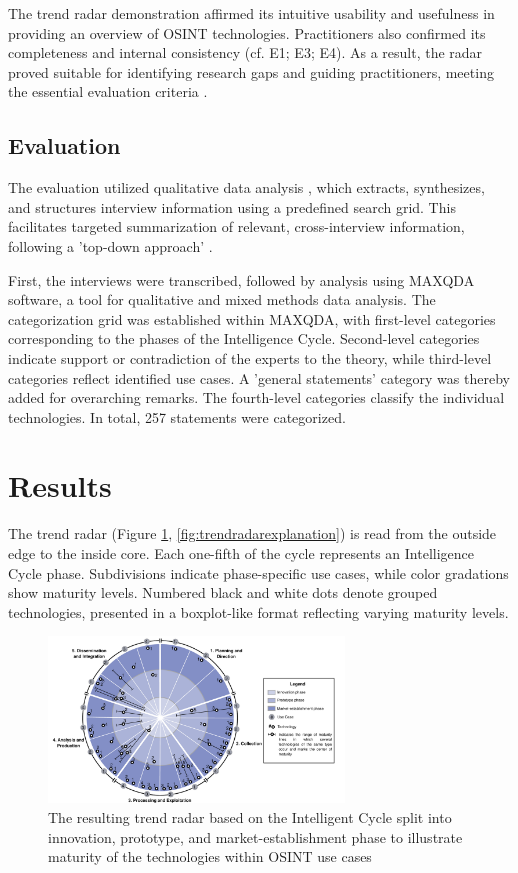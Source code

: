 \documentclass[10pt]{article}
\begin{document}
The trend radar demonstration affirmed its intuitive usability and usefulness in providing an overview of OSINT technologies. Practitioners also confirmed its completeness and internal consistency (cf. E1; E3; E4). As a result, the radar proved suitable for identifying research gaps and guiding practitioners, meeting the essential evaluation criteria \cite{Sonnenberg.2012}.

\subsection{Evaluation} \label{sec:eval}

The evaluation utilized qualitative data analysis \cite{Glaser.2009}, which extracts, synthesizes, and structures interview information using a predefined search grid. This facilitates targeted summarization of relevant, cross-interview information, following a 'top-down approach' \cite{Bogner.2014, Glaser.2009}.

First, the interviews were transcribed, followed by analysis using MAXQDA software, a tool for qualitative and mixed methods data analysis. The categorization grid was established within MAXQDA, with first-level categories corresponding to the phases of the Intelligence Cycle. Second-level categories indicate support or contradiction of the experts to the theory, while third-level categories reflect identified use cases. A 'general statements' category was thereby added for overarching remarks. The fourth-level categories classify the individual technologies. In total, 257 statements were categorized.

\section{Results} \label{sec:results}

The trend radar (Figure \ref{fig:trendradar}, \ref{fig:trendradarexplanation}) is read from the outside edge to the inside core.
Each one-fifth of the cycle represents an Intelligence Cycle phase. Subdivisions indicate
phase-specific use cases, while color gradations show maturity levels. Numbered black
and white dots denote grouped technologies, presented in a boxplot-like format reflecting
varying maturity levels.

\begin{figure}[thb]
    \centering
    \includegraphics[width=0.7\textwidth]{PDF/images/crop_Trendradar}
    \caption{The resulting trend radar based on the Intelligent Cycle split into innovation, prototype, and market-establishment phase to illustrate maturity of the technologies within OSINT use cases}
    \label{fig:trendradar}
\end{figure}
\end{document}
